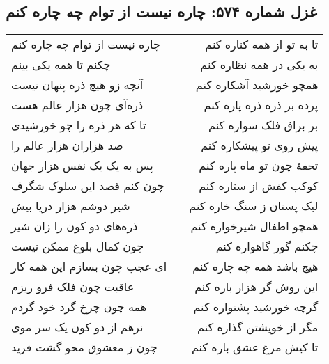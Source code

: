 \begin{center}
\section*{غزل شماره ۵۷۴: چاره نیست از توام چه چاره کنم}
\label{sec:574}
\begin{longtable}{l p{0.5cm} r}
چاره نیست از توام چه چاره کنم
&&
تا به تو از همه کناره کنم
\\
چکنم تا همه یکی بینم
&&
به یکی در همه نظاره کنم
\\
آنچه زو هیچ ذره پنهان نیست
&&
همچو خورشید آشکاره کنم
\\
ذره‌آی چون هزار عالم هست
&&
پرده بر ذره ذره پاره کنم
\\
تا که هر ذره را چو خورشیدی
&&
بر براق فلک سواره کنم
\\
صد هزاران هزار عالم را
&&
پیش روی تو پیشکاره کنم
\\
پس به یک یک نفس هزار جهان
&&
تحفهٔ چون تو ماه پاره کنم
\\
چون کنم قصد این سلوک شگرف
&&
کوکب کفش از ستاره کنم
\\
شیر دوشم هزار دریا بیش
&&
لیک پستان ز سنگ خاره کنم
\\
ذره‌های دو کون را زان شیر
&&
همچو اطفال شیرخواره کنم
\\
چون کمال بلوغ ممکن نیست
&&
چکنم گور گاهواره کنم
\\
ای عجب چون بسازم این همه کار
&&
هیچ باشد همه چه چاره کنم
\\
عاقبت چون فلک فرو ریزم
&&
این روش گر هزار باره کنم
\\
همه چون چرخ گرد خود گردم
&&
گرچه خورشید پشتواره کنم
\\
نرهم از دو کون یک سر موی
&&
مگر از خویشتن گذاره کنم
\\
چون ز معشوق محو گشت فرید
&&
تا کیش مرغ عشق باره کنم
\\
\end{longtable}
\end{center}
